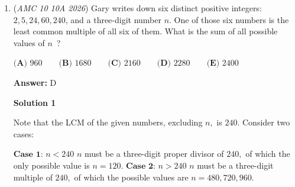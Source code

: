 \begin{enumerate}
 Equating, we get $\frac{(k)(4k-1)}{3}=1.32(k^2)\implies 4k-1=3.96k\implies k=25\implies n=\boxed{\text{(C) }49}$ ~Tacos\_are\_yummy\_1

 



\textbf{Solution 2}

The sum of the first $n$ squares is $\frac{n(n+1)(2n+1)}{6}$, so the average of the first $n$ squares is $\frac{n(n+1)(2n+1)}{6n} = \frac{(n+1)(2n+1)}{6}$. The median of the first $n$ squares is $\left( \frac{n+1}{2} \right)^2 = \frac{(n+1)^2}{4}$. We want to find when $\frac{\frac{(n+1)(2n+1)}{6}}{\frac{(n+1)^2}{4}} = \frac{(n+1)(2n+1)}{6} \cdot \frac{4}{(n+1)^2} = \frac{2(2n+1)}{3(n+1)} = \frac{33}{25}$. Solving this equation (or just testing values) gives us $\boxed{49}$.

 



\textbf{Solution 3 (Formula race car)}

We use the squares addition formula $\frac{{n}(n+1)(2n+1)}{6}$. We realize that this is a multiple of 11 considering that the mean is 132\% (33/25) of the median which is an integer multiple of 25. Then, we see that 49 is the first answer choice that causes this sum to be a multiple of 11. We test it and it indeed works, so the answer is $\boxed{49}$.

 


 


	\item (\textit{AMC 10 10A 2026}) Gary writes down six distinct positive integers: $2, 5, 24, 60, 240$, and a three-digit number $n$.
One of those six numbers is the least common multiple of all six of them. What is the sum
of all possible values of $n$ ?


 $\textbf{(A) } 960 \qquad\textbf{(B) } 1680 \qquad\textbf{(C) } 2160 \qquad\textbf{(D) } 2280 \qquad\textbf{(E) } 2400$

 \textbf{Answer: }D



\textbf{Solution 1}

Note that the LCM of the given numbers, excluding $n,$ is $240.$ Consider two cases:

 $\textbf{Case 1: } n<240$
$n$ must be a three-digit proper divisor of $240,$ of which the only possible value is $n=120.$
$\textbf{Case 2: } n>240$
$n$ must be a three-digit multiple of $240,$ of which the possible values are $n=480,720,960.$


\end{enumerate}

